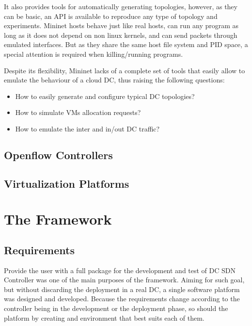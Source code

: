 \documentclass[12pt,english,oneside]{book}
\begin{document}
It also provides tools for automatically generating topologies, however, as they can be basic, an API is available to reproduce any type of topology and experiments.
Mininet hosts behave just like real hosts, can run any program as long as it does not depend on non linux kernels, and can send packets through emulated interfaces.
But as they share the same host file system and PID space, a special attention is required when killing/running programs.

Despite its flexibility, Mininet lacks of a complete set of tools that easily allow to emulate the behaviour of a cloud DC, thus raising the following questions:
 
\begin{itemize}
\item How to easily generate and configure typical DC topologies?
\item How to simulate VMs allocation requests?
\item How to emulate the inter and in/out DC traffic?
\end{itemize}

\newpage
\section{Openflow Controllers}
\hspace{0.6cm}


\newpage
\section{Virtualization Platforms}
\hspace{0.6cm}


\chapter{The Framework \label{cha:framework} }


\section{Requirements}
\hspace{0.6cm}

Provide the user with a full package for the development and test of DC SDN Controller was one of the main purposes of the framework.
Aiming for such goal, but without discarding the deployment in a real DC, a single software platform was designed and developed.
Because the requirements change according to the controller being in the development or the deployment phase, so should the platform by creating and environment that best suits each of them.
\end{document}
